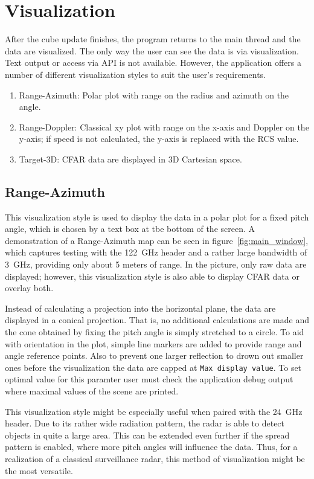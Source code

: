 \section{Visualization}

After the cube update finishes, the program returns to the main thread and the data are visualized.
The only way the user can see the data is via visualization.
Text output or access via API is not available.
However, the application offers a number of different visualization styles to suit the user's requirements.

\begin{enumerate}
	\item Range-Azimuth: Polar plot with range on the radius and azimuth on the angle.
	\item Range-Doppler: Classical xy plot with range on the x-axis and Doppler on the y-axis; if speed is not calculated, the y-axis is replaced with the RCS value.
	\item Target-3D: CFAR data are displayed in 3D Cartesian space.
\end{enumerate}

\subsection{Range-Azimuth}

This visualization style is used to display the data in a polar plot for a fixed pitch angle, which is chosen by a text box at tbe bottom of the screen.
A demonstration of a Range-Azimuth map can be seen in figure~\ref{fig:main_window}, which captures testing with the 122~GHz header and a rather large bandwidth of 3~GHz, providing only about 5 meters of range.
In the picture, only raw data are displayed; however, this visualization style is also able to display CFAR data or overlay both.

Instead of calculating a projection into the horizontal plane, the data are displayed in a conical projection.
That is, no additional calculations are made and the cone obtained by fixing the pitch angle is simply stretched to a circle.
To aid with orientation in the plot, simple line markers are added to provide range and angle reference points.
Also to prevent one larger reflection to drown out smaller ones before the visualization the data are capped at \texttt{Max display value}.
To set optimal value for this paramter user must check the application debug output  where maximal values of the scene are printed.

This visualization style might be especially useful when paired with the 24~GHz header.
Due to its rather wide radiation pattern, the radar is able to detect objects in quite a large area.
This can be extended even further if the spread pattern is enabled, where more pitch angles will influence the data.
Thus, for a realization of a classical surveillance radar, this method of visualization might be the most versatile.


